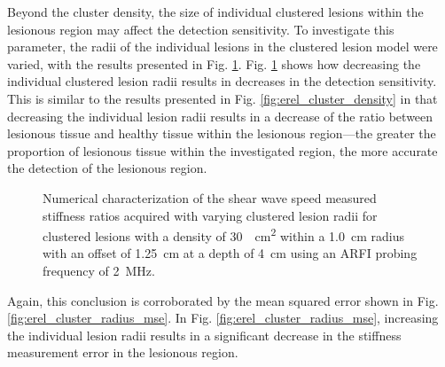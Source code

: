 			Beyond the cluster density, the size of individual clustered lesions within the lesionous region may affect the detection sensitivity. To investigate this parameter, the radii of the individual lesions in the clustered lesion model were varied, with the results presented in Fig. \ref{fig:erel_cluster_radius}. Fig. \ref{fig:erel_cluster_radius} shows how decreasing the individual clustered lesion radii results in decreases in the detection sensitivity. This is similar to the results presented in Fig. \ref{fig:erel_cluster_density} in that decreasing the individual lesion radii results in a decrease of the ratio between lesionous tissue and healthy tissue within the lesionous region---the greater the proportion of lesionous tissue within the investigated region, the more accurate the detection of the lesionous region.

			\begin{figure}[!htb]
				\centering
				\caption[Numerical characterization of shear wave speed measured stiffness ratio with clustered lesions]{Numerical characterization of the shear wave speed measured stiffness ratios acquired with varying clustered lesion radii for clustered lesions with a density of \SI{30}{\per\cm\squared} within a \SI{1.0}{cm} radius with an offset of \SI{1.25}{\cm} at a depth of \SI{4}{\cm} using an ARFI probing frequency of \SI{2}{\MHz}.}
				\label{fig:erel_cluster_radius}
			\end{figure}

			Again, this conclusion is corroborated by the mean squared error shown in Fig. \ref{fig:erel_cluster_radius_mse}. In Fig. \ref{fig:erel_cluster_radius_mse}, increasing the individual lesion radii results in a significant decrease in the stiffness measurement error in the lesionous region.

